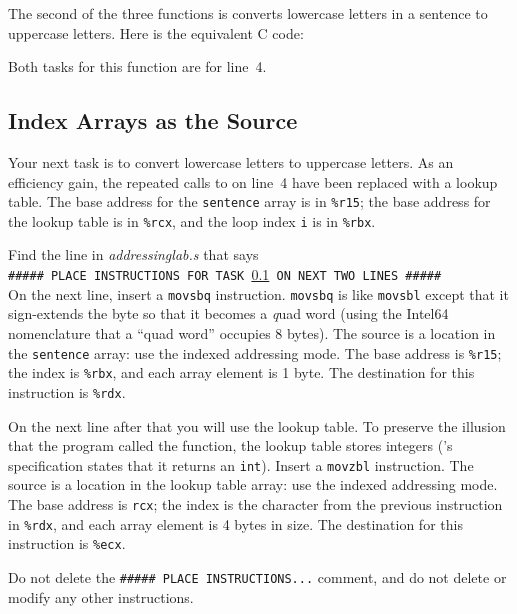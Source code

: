 The second of the three functions is converts lowercase letters in a sentence
to uppercase letters. Here is the equivalent C code:



Both tasks for this function are for line~4.

\subsection{Index Arrays as the Source}\label{task6}

Your next task is to convert lowercase letters to uppercase letters. As an
efficiency gain, the repeated calls to  on line~4 have been
replaced with a lookup table. The base address for the \lstinline{sentence}
array is in \lstinline{%r15}; the base address for the lookup table is in
\lstinline{%rcx}, and the loop index \lstinline{i} is in \lstinline{%rbx}.

Find the line in \textit{addressinglab.s} that says \\
\texttt{\#\#\#\#\# PLACE INSTRUCTIONS FOR TASK \ref{task6} ON NEXT TWO LINES \#\#\#\#\#} \\
On the next line, insert a \lstinline{movsbq} instruction. \lstinline{movsbq}
is like \lstinline{movsbl} except that it sign-extends the byte so that it
becomes a \textit{q}uad word (using the Intel64 nomenclature that a ``quad
word'' occupies 8 bytes). The source is a location in the \lstinline{sentence}
array: use the indexed addressing mode. The base address is \lstinline{%r15};
the index is \lstinline{%rbx}, and each array element is 1 byte. The
destination for this instruction is \lstinline{%rdx}.

On the next line after that you will use the  lookup table.
To preserve the illusion that the program called the 
function, the lookup table stores integers ('s specification
states that it returns an \lstinline{int}). Insert a \lstinline{movzbl}
instruction. The source is a location in the lookup table array: use the indexed
addressing mode. The base address is \lstinline{rcx}; the index is the
character from the previous instruction in \lstinline{%rdx}, and each array
element is 4 bytes in size. The destination for this instruction is
\lstinline{%ecx}.


Do not delete the \texttt{\#\#\#\#\# PLACE INSTRUCTIONS...} comment, and do not
delete or modify any other instructions.


